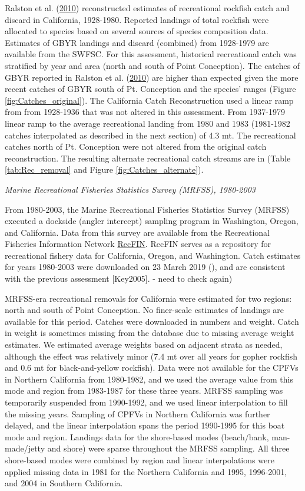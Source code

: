\documentclass[12pt,]{article}
\begin{document}
Ralston et al. (\protect\hyperlink{ref-Ralston2010}{2010}) reconstructed
estimates of recreational rockfish catch and discard in California,
1928-1980. Reported landings of total rockfish were allocated to species
based on several sources of species composition data. Estimates of GBYR
landings and discard (combined) from 1928-1979 are available from the
SWFSC. For this assessment, historical recreational catch was stratified
by year and area (north and south of Point Conception). The catches of
GBYR reported in Ralston et al.
(\protect\hyperlink{ref-Ralston2010}{2010}) are higher than expected
given the more recent catches of GBYR south of Pt. Conception and the
species' ranges (Figure \ref{fig:Catches_original}). The California
Catch Reconstruction used a linear ramp from from 1928-1936 that was not
altered in this assessment. From 1937-1979 linear ramp to the average
recreational landing from 1980 and 1983 (1981-1982 catches interpolated
as described in the next section) of 4.3 mt. The recreational catches
north of Pt. Conception were not altered from the original catch
reconstruction. The resulting alternate recreational catch streams are
in (Table \ref{tab:Rec_removal} and Figure \ref{fig:Catches_alternate}).

\emph{Marine Recreational Fisheries Statistics Survey (MRFSS),
1980-2003}

From 1980-2003, the Marine Recreational Fisheries Statistics Survey
(MRFSS) executed a dockside (angler intercept) sampling program in
Washington, Oregon, and California. Data from this survey are available
from the Recreational Fisheries Information Network
\href{www.recfin.org}{RecFIN}. RecFIN serves as a repository for
recreational fishery data for California, Oregon, and Washington. Catch
estimates for years 1980-2003 were downloaded on 23 March 2019 (), and
are consistent with the previous assessment {[}Key2005{]}. - need to
check again)

MRFSS-era recreational removals for California were estimated for two
regions: north and south of Point Conception. No finer-scale estimates
of landings are available for this period. Catches were downloaded in
numbers and weight. Catch in weight is sometimes missing from the
database due to missing average weight estimates. We estimated average
weights based on adjacent strata as needed, although the effect was
relatively minor (7.4 mt over all years for gopher rockfish and 0.6 mt
for black-and-yellow rockfish). Data were not available for the CPFVs in
Northern California from 1980-1982, and we used the average value from
this mode and region from 1983-1987 for these three years. MRFSS
sampling was temporarily suspended from 1990-1992, and we used linear
interpolation to fill the missing years. Sampling of CPFVs in Northern
California was further delayed, and the linear interpolation spans the
period 1990-1995 for this boat mode and region. Landings data for the
shore-based modes (beach/bank, man-made/jetty and shore) were sparse
throughout the MRFSS sampling. All three shore-based modes were combined
by region and linear interpolations were applied missing data in 1981
for the Northern California and 1995, 1996-2001, and 2004 in Southern
California.
\end{document}

